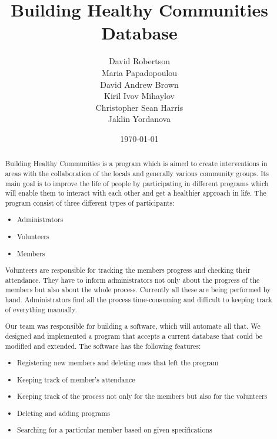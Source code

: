 \documentclass{l3proj}
\begin{document}
\title{Building Healthy Communities Database}

\author{David Robertson \\
Maria Papadopoulou \\
David Andrew Brown \\
Kiril Ivov Mihaylov \\
Christopher Sean Harris \\
Jaklin Yordanova}

\date{\today}

\maketitle

\begin{abstract}

Building Healthy Communities is a program which is aimed to create interventions in areas with the collaboration of the locals and generally various community groups. Its main goal is to improve the life of people by participating in different programs which will enable them to interact with each other and get a healthier approach in life. The program consist of three different types of participants:
\begin{itemize}
	\item Administrators
	\item Volunteers
	\item Members
\end{itemize}
Volunteers are responsible for tracking the members progress and checking their attendance. They have to inform administrators not only about the progress of the members but also about the whole process. Currently all these are being performed by hand. Administrators find all the process time-consuming and difficult to keeping track of everything manually. 

Our team was responsible for building a software, which will automate all that. We designed and implemented a program that accepts a current database that could be modified and extended. The software has the following features:
\begin{itemize}
	\item Registering new members and deleting ones that left the program
	\item Keeping track of member's attendance
	\item Keeping track of the process not only for the members but also for the volunteers
	\item Deleting and adding programs
	\item Searching for a particular member based on given specifications
\end{itemize} 

\end{abstract}
\end{document}
